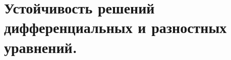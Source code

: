 \documentclass[../../calc-math-exam-2023.tex]{subfiles}
\begin{document}
    \section{Устойчивость решений дифференциальных и разностных уравнений.}\label{sec:ch19}
\end{document}
